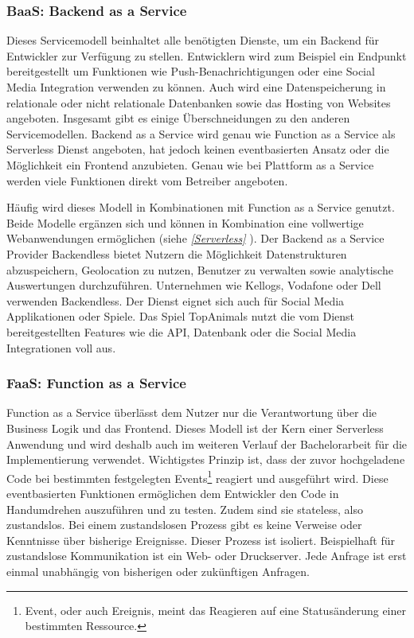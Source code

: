    \subsubsection{BaaS: Backend as a Service}
   Dieses Servicemodell beinhaltet alle benötigten Dienste, um ein Backend für Entwickler zur Verfügung zu stellen.
   Entwicklern wird zum Beispiel ein Endpunkt bereitgestellt um Funktionen wie Push-Benachrichtigungen oder eine Social Media Integration verwenden zu können.
   Auch wird eine Datenspeicherung in relationale oder nicht relationale Datenbanken sowie das Hosting von Websites angeboten. Insgesamt gibt es einige Überschneidungen zu den anderen Servicemodellen.
   Backend as a Service wird genau wie Function as a Service als Serverless Dienst angeboten, hat jedoch keinen eventbasierten Ansatz oder die Möglichkeit ein Frontend anzubieten.
   Genau wie bei Plattform as a Service werden viele Funktionen direkt vom Betreiber angeboten.

   Häufig wird dieses Modell in Kombinationen mit Function as a Service genutzt. Beide Modelle ergänzen sich und können in Kombination eine vollwertige
   Webanwendungen ermöglichen (siehe \textit{\ref{Serverless} }).
   Der Backend as a Service Provider Backendless bietet Nutzern die Möglichkeit Datenstrukturen abzuspeichern, Geolocation zu nutzen,
   Benutzer zu verwalten sowie analytische Auswertungen durchzuführen. Unternehmen wie Kellogs, Vodafone oder Dell verwenden Backendless.
   Der Dienst eignet sich auch für Social Media Applikationen oder Spiele. Das Spiel TopAnimals nutzt die vom Dienst bereitgestellten Features wie
   die API, Datenbank oder die Social Media Integrationen voll aus. \cite[]{Backendless}


   \subsubsection{FaaS: Function as a Service}
   \label{FaaS}
   Function as a Service überlässt dem Nutzer nur die Verantwortung über die Business Logik und das Frontend.
   Dieses Modell ist der Kern einer Serverless Anwendung und wird deshalb auch im weiteren Verlauf der Bachelorarbeit für die Implementierung verwendet.
   Wichtigstes Prinzip ist, dass der zuvor hochgeladene Code bei bestimmten festgelegten Events\footnote{Event, oder auch Ereignis, meint das Reagieren auf eine Statusänderung einer bestimmten Ressource.} reagiert und ausgeführt wird.
   Diese eventbasierten Funktionen ermöglichen dem Entwickler den Code in Handumdrehen auszuführen und zu testen.
   Zudem sind sie stateless, also zustandslos. Bei einem zustandslosen Prozess gibt es keine Verweise oder Kenntnisse über bisherige Ereignisse.
   Dieser Prozess ist isoliert. Beispielhaft für zustandslose Kommunikation ist ein Web- oder Druckserver.
   Jede Anfrage ist erst einmal unabhängig von bisherigen oder zukünftigen Anfragen.\cite[]{Zustandslos}

